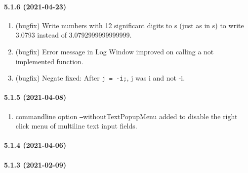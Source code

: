 \paragraph{5.1.6 (2021-04-23)}  %
\begin{enumerate}
\item (bugfix) Write \REAL{} numbers with 12 significant digits to \JSON{} \STREAM s
               (just as in \XML{} \STREAM s) to write 3.0793 instead of 3.0792999999999999.
\item (bugfix) Error message in Log Window improved on calling a not implemented function.
\item (bugfix) Negate fixed: After \verb|j = -i;|, j was i and not -i.
\end{enumerate}

\paragraph{5.1.5 (2021-04-08)}  %
\begin{enumerate}
\item \INTENS{} commandline option \texttt{--}withoutTextPopupMenu added
      to disable the right click menu of multiline text input fields.
\end{enumerate}

\paragraph{5.1.4 (2021-04-06)}  %

\paragraph{5.1.3 (2021-02-09)}  %


